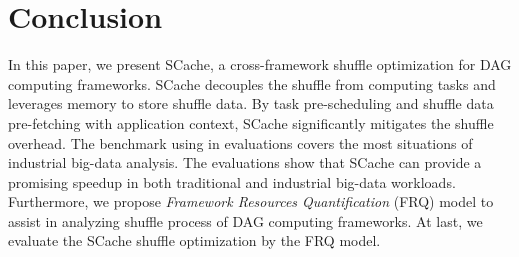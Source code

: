 \section{Conclusion}
In this paper, we present SCache, a cross-framework shuffle optimization for DAG computing frameworks. 
SCache decouples the shuffle from computing tasks and leverages memory to store shuffle data. 
By task pre-scheduling and shuffle data pre-fetching with application context, SCache significantly mitigates the shuffle overhead. 
{\color{blue}
The benchmark using in evaluations covers the most situations of industrial big-data analysis.
The evaluations show that SCache can provide a promising speedup in both traditional and industrial big-data workloads. 
Furthermore, we propose \textit{Framework Resources Quantification} (FRQ) model to assist in analyzing shuffle process of DAG computing frameworks. At last, we evaluate the SCache shuffle optimization by the FRQ model.
}
